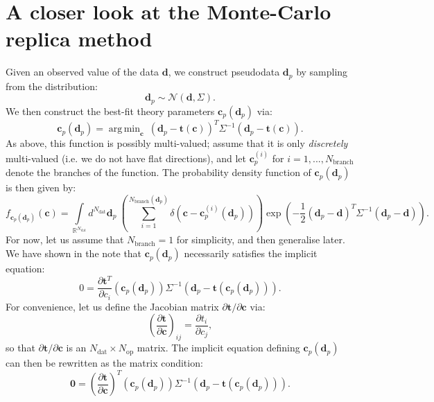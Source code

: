 \documentclass[withindex,glossary]{cam-thesis}
\renewcommand{\vec}[1]{\textbf{#1}} %
\DeclareMathOperator*{\argmin}{arg\,min}
\begin{document}
\section{A closer look at the Monte-Carlo replica method}
\label{sec:careful_mc}
Given an observed value of the data $\vec{d}$, we construct pseudodata $\vec{d}_p$ by sampling from the distribution:
\begin{equation}
\vec{d}_p \sim \mathcal{N}(\vec{d}, \Sigma).
\end{equation}
We then construct the best-fit theory parameters $\vec{c}_p(\vec{d}_p)$ via:
\begin{equation}
\vec{c}_p(\vec{d}_p) = \argmin_{\vec{c}}\ (\vec{d}_p - \vec{t}(\vec{c}))^T \Sigma^{-1} (\vec{d}_p - \vec{t}(\vec{c})) .
\end{equation}
As above, this function is possibly multi-valued; assume that it is only \textit{discretely} multi-valued (i.e. we do not have flat directions), and let $\vec{c}_p^{(i)}$ for $i=1,...,N_{\text{branch}}$ denote the branches of the function. The probability density function of $\vec{c}_p(\vec{d}_p)$ is then given by:
\begin{equation}
f_{\vec{c}_p(\vec{d}_p)}(\vec{c}) = \int\limits_{\mathbb{R}^{N_{\text{dat}}}} d^{N_{\text{dat}}}\vec{d}_p\ \left( \sum_{i=1}^{N_{\text{branch}}(\vec{d}_p)}\delta\left(\vec{c} - \vec{c}_p^{(i)}(\vec{d}_p) \right)\right) \exp\left( -\frac{1}{2} (\vec{d}_p - \vec{d})^T \Sigma^{-1} (\vec{d}_p - \vec{d}) \right).
\end{equation}
For now, let us assume that $N_{\text{branch}} = 1$ for simplicity, and then generalise later. We have shown in the note that $\vec{c}_p(\vec{d}_p)$ necessarily satisfies the implicit equation:
\begin{equation*}
0 = \frac{\partial \vec{t}^T}{\partial c_i} (\vec{c}_p(\vec{d}_p)) \Sigma^{-1} \left( \vec{d}_p - \vec{t}(\vec{c}_p(\vec{d}_p)) \right).
\end{equation*}
For convenience, let us define the Jacobian matrix $\partial \vec{t} / \partial \vec{c}$ via:
\begin{equation*}
\left(\frac{\partial \vec{t}}{\partial \vec{c}}\right)_{ij} = \frac{\partial t_i}{\partial c_j},
\end{equation*}
so that $\partial \vec{t} / \partial \vec{c}$ is an $N_{\text{dat}} \times N_{\text{op}}$ matrix. The implicit equation defining $\vec{c}_p(\vec{d}_p)$ can then be rewritten as the matrix condition:
\begin{equation}
\vec{0} = \left(\frac{\partial \vec{t}}{\partial \vec{c}}\right)^T(\vec{c}_p(\vec{d}_p)) \Sigma^{-1} \left( \vec{d}_p - \vec{t}(\vec{c}_p(\vec{d}_p)) \right).
\end{equation}
\end{document}
